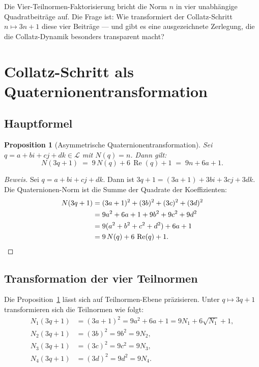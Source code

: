 \documentclass[12pt,a4paper]{article}
\newtheorem{proposition}[definition]{Proposition}
\newenvironment{beweis}{\begin{proof}[Beweis]}{\end{proof}}
\newcommand{\Re}{\operatorname{Re}}
\begin{document}
\begin{tcolorbox}[kernidee]
Die Vier-Teilnormen-Faktorisierung bricht die Norm $n$ in vier unabhängige Quadratbeiträge
auf. Die Frage ist: Wie transformiert der Collatz-Schritt $n \mapsto 3n+1$ diese vier
Beiträge --- und gibt es eine ausgezeichnete Zerlegung, die die Collatz-Dynamik
besonders transparent macht?
\end{tcolorbox}

\section{Collatz-Schritt als Quaternionentransformation}
\label{sec:transformation}

\subsection{Hauptformel}

\begin{proposition}[Asymmetrische Quaternionentransformation]
\label{prop:hauptformel}
Sei $q = a + bi + cj + dk \in \mathcal{L}$ mit $N(q) = n$. Dann gilt:
\[
  \boxed{N(3q+1) \;=\; 9\,N(q) + 6\,\Re(q) + 1 \;=\; 9n + 6a + 1.}
\]
\end{proposition}

\begin{beweis}
Sei $q = a + bi + cj + dk$. Dann ist $3q + 1 = (3a+1) + 3bi + 3cj + 3dk$.
Die Quaternionen-Norm ist die Summe der Quadrate der Koeffizienten:
\begin{align*}
  N(3q+1) &= (3a+1)^2 + (3b)^2 + (3c)^2 + (3d)^2 \\
           &= 9a^2 + 6a + 1 + 9b^2 + 9c^2 + 9d^2 \\
           &= 9(a^2+b^2+c^2+d^2) + 6a + 1 \\
           &= 9\,N(q) + 6\,\Re(q) + 1. \qedhere
\end{align*}
\end{beweis}

\subsection{Transformation der vier Teilnormen}

Die Proposition~\ref{prop:hauptformel} lässt sich auf Teilnormen-Ebene präzisieren.
Unter $q \mapsto 3q+1$ transformieren sich die Teilnormen wie folgt:
\begin{align}
  N_1(3q+1) &= (3a+1)^2 = 9a^2 + 6a + 1 = 9N_1 + 6\sqrt{N_1} + 1, \label{eq:N1}\\
  N_2(3q+1) &= (3b)^2   = 9b^2            = 9N_2, \label{eq:N2}\\
  N_3(3q+1) &= (3c)^2   = 9c^2            = 9N_3, \label{eq:N3}\\
  N_4(3q+1) &= (3d)^2   = 9d^2            = 9N_4. \label{eq:N4}
\end{align}
\end{document}
